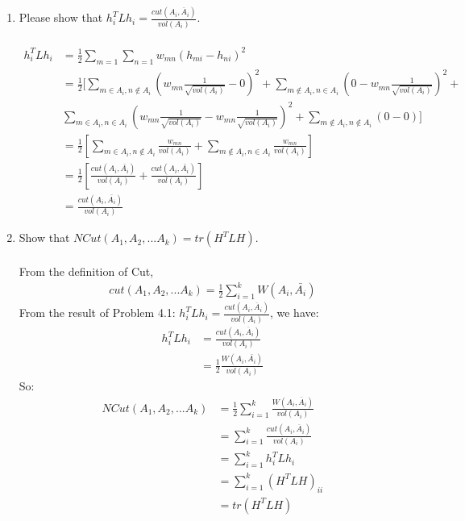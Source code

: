 \documentclass[11pt]{article}
\begin{document}
\begin{enumerate}
	\item Please show that $h_i^TLh_i =\frac{cut(A_i, \overline{A}_i)}{vol(A_i)}$.\\ \\
	\begin{equation}
		\begin{aligned}
			h_i^TLh_i &= \frac{1}{2}\sum_{m=1}\sum_{n=1}w_{mn}(h_{mi}-h_{ni})^2\\
			&= \frac{1}{2} [ \sum_{m\in A_i,n\notin A_i}(w_{mn}\frac{1}{\sqrt{vol(A_i)}} - 0)^2 + \sum_{m\notin A_i,n\in A_i}(0 - w_{mn}\frac{1}{\sqrt{vol(A_i)}})^2 + \\& \sum_{m\in A_i,n\in A_i}(w_{mn}\frac{1}{\sqrt{vol(A_i)}} - w_{mn}\frac{1}{\sqrt{vol(A_i)}})^2 + \sum_{m\notin A_i,n\notin A_i}(0 - 0) ]\\
			&=\frac{1}{2} [ \sum_{m\in A_i,n\notin A_i}\frac{w_{mn}}{vol(A_i)} + \sum_{m\notin A_i,n\in A_i} \frac{w_{mn}}{vol(A_i)} ]\\
			&=\frac{1}{2} [ \frac{cut(A_i,\bar{A_i})}{vol(A_i)} + \frac{cut(A_i,\bar{A_i})}{vol(A_i)} ]\\
			&=\frac{cut(A_i,\bar{A_i})}{vol(A_i)}
		\end{aligned}
	\end{equation}
	\item Show that $NCut(A_1,A_2,...A_k) = tr(H^TLH)$.\\ \\
	From the definition of Cut,
	\begin{equation}
		\begin{aligned}
			cut(A_1,A_2,...A_k) = \frac{1}{2}\sum\limits_{i=1}^{k}W(A_i,\bar{A_i})
		\end{aligned}
	\end{equation}
	From the result of Problem 4.1: $h_i^TLh_i = \frac{cut(A_i, \overline{A}_i)}{vol(A_i)}$, we have:
	\begin{equation}
		\begin{aligned}
			h_i^TLh_i &= \frac{cut(A_i, \overline{A}_i)}{vol(A_i)}\\
			&= \frac{1}{2} \frac{W(A_i,\bar{A_i})}{vol(A_i)}
		\end{aligned}
	\end{equation}
	So: 
	\begin{equation}
		\begin{aligned}
			NCut(A_1,A_2,...A_k) &= \frac{1}{2}\sum\limits_{i=1}^{k}\frac{W(A_i, \overline{A}_i )}{vol(A_i)}\\
			&= \sum\limits_{i=1}^{k} \frac{cut(A_i, \overline{A}_i)}{vol(A_i)}\\
			&= \sum\limits_{i=1}^{k} h_i^TLh_i \\
			&= \sum\limits_{i=1}^{k} (H^TLH)_{ii} \\
			&= tr(H^TLH)
		\end{aligned}
	\end{equation}
	

\end{enumerate}
\end{document}
